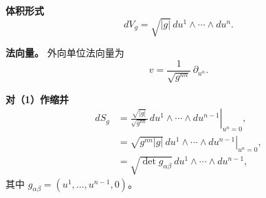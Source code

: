 \noindent\textbf{体积形式}
\[
  dV_g=\sqrt{|g|}\,du^1\wedge\cdots\wedge du^n.
\]

\noindent\textbf{法向量。} 外向单位法向量为%
%
\[
  v=\frac{1}{\sqrt{g^{nn}}}\,\partial_{u^n}.
\]

\noindent\textbf{对（1）作缩并}
\begin{align*}
  dS_g
   &=\left.\frac{\sqrt{|g|}}{\sqrt{g^{nn}}}\,du^1\wedge\cdots\wedge du^{n-1}
      \right|_{u^n=0},\\
   &=\left.\sqrt{g^{nn}|g|}\,du^1\wedge\cdots\wedge du^{n-1}\right|_{u^n=0},\\
   &=\sqrt{\det g_{\alpha\beta}}\,du^1\wedge\cdots\wedge du^{n-1},
\end{align*}
其中 $g_{\alpha\beta}=(u^1,\dots,u^{n-1},0)$。%
